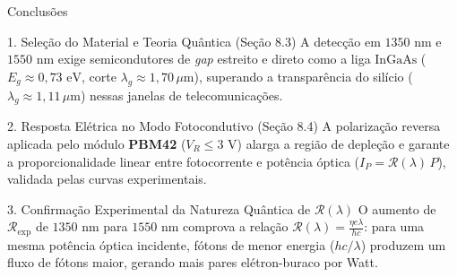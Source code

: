 \documentclass[aspectratio=169, 9pt]{beamer}
\begin{document}
\begin{frame}{Conclusões}
  \begin{block}{1. Seleção do Material e Teoria Quântica (Seção 8.3)}
    A detecção em $1350\text{ nm}$ e $1550\text{ nm}$ exige semicondutores de \textit{gap} estreito e direto como a liga $\text{InGaAs}$ ($E_g \approx 0{,}73\text{ eV}$, corte $\lambda_g \approx 1{,}70\,\mu\text{m}$), superando a transparência do silício ($\lambda_g \approx 1{,}11\,\mu\text{m}$) nessas janelas de telecomunicações.
  \end{block}
  \vspace{0.08cm}
  \begin{exampleblock}{2. Resposta Elétrica no Modo Fotocondutivo (Seção 8.4)}
    A polarização reversa aplicada pelo módulo \textbf{PBM42} ($V_R \le 3\text{ V}$) alarga a região de depleção e garante a proporcionalidade linear entre fotocorrente e potência óptica ($I_P = \mathcal{R}(\lambda)\,P$), validada pelas curvas experimentais.
  \end{exampleblock}
  \vspace{0.08cm}
  \begin{alertblock}{3. Confirmação Experimental da Natureza Quântica de $\mathcal{R}(\lambda)$}
    O aumento de $\mathcal{R}_{\text{exp}}$ de $1350\text{ nm}$ para $1550\text{ nm}$ comprova a relação $\mathcal{R}(\lambda) = \frac{\eta e\lambda}{hc}$: para uma mesma potência óptica incidente, fótons de menor energia ($hc/\lambda$) produzem um fluxo de fótons maior, gerando mais pares elétron-buraco por Watt.
  \end{alertblock}
\end{frame}
\end{document}
